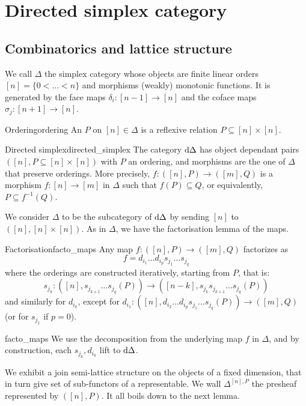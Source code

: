 \section{Directed simplex category}

\subsection{Combinatorics and lattice structure}

We call \( \Delta \) the simplex category whose objects are finite linear orders \( [n] = \{0 < \dots < n\} \) and morphisms (weakly) monotonic functions. It is generated by the face maps \( \delta_i : [n-1] \to [n] \) and the coface maps \( \sigma_j : [n+1] \to [n] \).

\begin{cdef}{Ordering}{ordering}
    An  \( P \) on \( [n] \in \Delta \) is a reflexive relation \( P \subseteq [n] \times [n]  \).
\end{cdef}

\begin{cdef}{Directed simplex}{directed_simplex}
    The  category \( \mathrm{d}\Delta \) has object dependant pairs \( ([n], P \subseteq [n] \times [n]) \) with \( P \) an ordering, and morphisms are the one of \( \Delta \) that preserve orderings. More precisely, \( f : ([n], P) \to ([m], Q) \) is a morphism \( f : [n] \to [m] \) in \( \Delta \) such that \( f(P) \subseteq Q \), or equivalently, \( P \subseteq f^{-1}(Q) \).
\end{cdef}

We consider \( \Delta \) to be the subcategory of \( \mathrm{d}\Delta \) by sending \( [n] \) to \( ([n], [n] \times [n]) \). As in \( \Delta \), we have the factorisation lemma of the maps.
\begin{clem}{Factorisation}{facto_maps}
    Any map \( f : ([n], P) \to ([m], Q) \) factorizes as 
    \begin{equation*}
        f = d_{i_1}\dots d_{i_p}s_{j_1}\dots s_{j_q}
    \end{equation*}
    where the orderings are constructed iteratively, starting from \( P \), that is:
    \begin{equation*}
        s_{j_k} : ([n], s_{j_{k+1}}\dots s_{j_q}(P)) \to ([n - k], s_{j_k}s_{j_{k+1}}\dots s_{j_q}(P)) 
    \end{equation*}
    and similarly for \( d_{i_k} \), except for \( d_{i_1} : ([n], d_{i_2}\dots d_{i_p}s_{j_1}\dots s_{j_q}(P)) \to ([m], Q) \) (or for \( s_{j_1} \) if \( p = 0 \)).
\end{clem} 
\begin{lemproof}{facto_maps}
    We use the decomposition from the underlying map \( f \) in \( \Delta \), and by construction, each \( s_{j_k}, d_{i_k} \) lift to \( \mathrm{d}\Delta \).
\end{lemproof}
We exhibit a join semi-lattice structure on the objects of a fixed dimension, that in turn give set of sub-functors of a representable. We wall \( \Delta^{[n], P} \) the presheaf represented by \( ([n], P) \). It all boils down to the next lemma.
